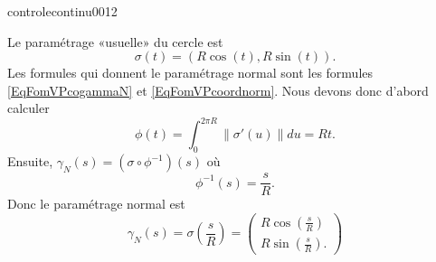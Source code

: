 \begin{corrige}{controlecontinu0012}

    Le paramétrage «usuelle»  du cercle est 
    \begin{equation}
        \sigma(t)=(R\cos(t),R\sin(t)).
    \end{equation}
    Les formules qui donnent le paramétrage normal sont les formules \eqref{EqFomVPcogammaN} et \eqref{EqFomVPcoordnorm}. Nous devons donc  d'abord calculer
    \begin{equation}
        \phi(t)=\int_0^{2\pi R}\| \sigma'(u) \|du=Rt.
    \end{equation}
    Ensuite, \( \gamma_N(s)=(\sigma\circ\phi^{-1})(s)\) où 
    \begin{equation}
        \phi^{-1}(s)=\frac{ s }{ R }.       
    \end{equation}
    Donc le paramétrage normal est
    \begin{equation}
        \gamma_N(s)=\sigma\left( \frac{ s }{ R } \right)=\begin{pmatrix}
            R\cos\left( \frac{ s }{ R } \right)    \\ 
            R\sin\left( \frac{ s }{ R } \right).    
        \end{pmatrix}
    \end{equation}

\end{corrige}
